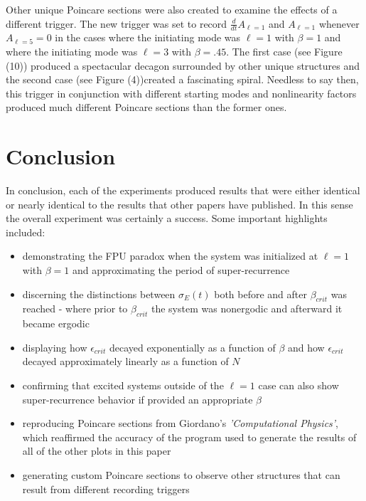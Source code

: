 \documentclass[twocolumn]{article}
\begin{document}
Other unique Poincare sections were also created to examine the effects of a different trigger. The new trigger was set to record $\frac{d}{dt}A_{\ell=1 }$ and $A_{\ell=1}$ whenever $A_{\ell=5}=0$ in the cases where the initiating mode was $\ell=1$ with $\beta=1$ and where the initiating mode was $\ell=3$ with $\beta=.45$. The first case (see Figure (10)) produced a spectacular decagon surrounded by other unique structures and the second case (see Figure (4))created a fascinating spiral. Needless to say then, this trigger in conjunction with different starting modes and nonlinearity factors produced much different Poincare sections than the former ones.
\section{Conclusion}
In conclusion, each of the experiments produced results that were either identical or nearly identical to the results that other papers have published. In this sense the overall experiment was certainly a success. Some important highlights included: 
\begin{itemize}
\item demonstrating the FPU paradox when the system was initialized at $\ell=1$ with $\beta=1$ and approximating the period of super-recurrence
\item discerning the distinctions between $\sigma_E(t)$ both before and after $\beta_{crit}$ was reached - where prior to $\beta_{crit}$ the system was nonergodic and afterward it became ergodic
\item displaying how $\epsilon_{crit}$ decayed exponentially as a function of $\beta$ and how $\epsilon_{crit}$ decayed approximately linearly as a function of $N$
\item confirming that excited systems outside of the $\ell=1$ case can also show super-recurrence behavior if provided an appropriate $\beta$
\item reproducing Poincare sections from Giordano's \textit{'Computational Physics'}, which reaffirmed the accuracy of the program used to generate the results of all of the other plots in this paper
\item generating custom Poincare sections to observe other structures that can result from different recording triggers
\end{itemize}
\end{document}
